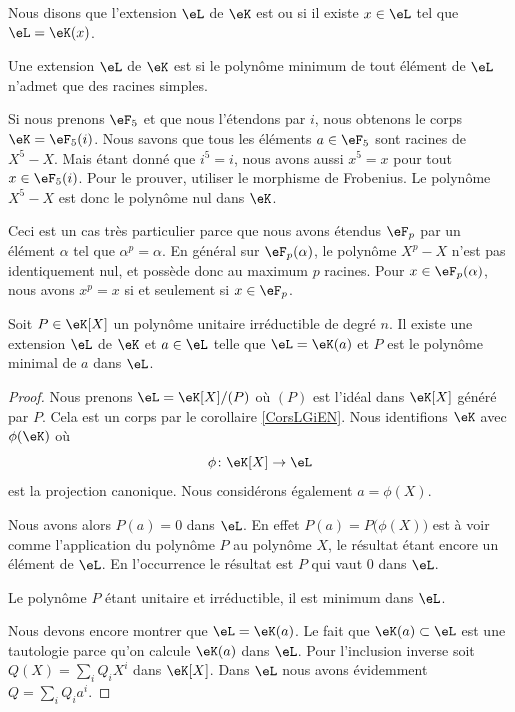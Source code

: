 Nous disons que l'extension \( \eL\) de \( \eK\) est  ou  si il existe \( x\in\eL\) tel que \( \eL=\eK(x)\).

Une extension \( \eL\) de \( \eK\) est  si le polynôme minimum de tout élément de \( \eL\) n'admet que des racines simples.

\begin{example} \label{ExLQhLhJ}
    Si nous prenons \( \eF_5\) et que nous l'étendons par \( i\), nous obtenons le corps \( \eK=\eF_5(i)\). Nous savons que tous les éléments \( a\in \eF_5\) sont racines de \( X^5-X\). Mais étant donné que \( i^5=i\), nous avons aussi \( x^5=x\) pour tout \( x\in \eF_5(i)\). Pour le prouver, utiliser le morphisme de Frobenius. Le polynôme \( X^5-X\) est donc le polynôme nul dans \( \eK\).

    Ceci est un cas très particulier parce que nous avons étendus \( \eF_p\) par un élément \( \alpha\) tel que \( \alpha^p=\alpha\). En général sur \( \eF_p(\alpha)\), le polynôme \( X^p-X\) n'est pas identiquement nul, et possède donc au maximum \( p\) racines. Pour \( x\in \eF_p(\alpha)\), nous avons \( x^p=x\) si et seulement si \( x\in \eF_p\).
\end{example}

\begin{lemma}
    Soit \( P\in\eK[X]\) un polynôme unitaire irréductible de degré \( n\). Il existe une extension \( \eL\) de \( \eK\) et \( a\in \eL\) telle que \( \eL=\eK(a)\) et \( P\) est le polynôme minimal de \( a\) dans \( \eL\).
\end{lemma}

\begin{proof}
    Nous prenons \( \eL=\eK[X]/(P)\) où \( (P)\) est l'idéal dans \( \eK[X]\) généré par \( P\). Cela est un corps par le corollaire \ref{CorsLGiEN}. Nous identifions \( \eK\) avec \( \phi(\eK)\) où
    \begin{equation}
        \phi\colon \eK[X]\to \eL 
    \end{equation}
    est la projection canonique. Nous considérons également \( a=\phi(X)\).

    Nous avons alors \( P(a)=0\) dans \( \eL\). En effet \( P(a)=P\big( \phi(X) \big)\) est à voir comme l'application du polynôme \( P\) au polynôme \( X\), le résultat étant encore un élément de \( \eL\). En l'occurrence le résultat est \( P\) qui vaut \( 0\) dans \( \eL\).

    Le polynôme \( P\) étant unitaire et irréductible, il est minimum dans \( \eL\).

    Nous devons encore montrer que \( \eL=\eK(a)\). Le fait que \( \eK(a)\subset \eL\) est une tautologie parce qu'on calcule \( \eK(a)\) dans \( \eL\). Pour l'inclusion inverse soit \( Q(X)=\sum_iQ_iX^i\) dans \( \eK[X]\). Dans \( \eL\) nous avons évidemment \( Q=\sum_iQ_ia^i\).
\end{proof}

